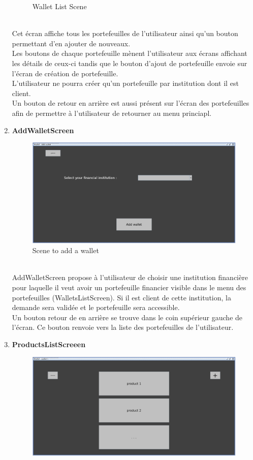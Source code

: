 \documentclass[../rapport.tex]{subfiles}
\begin{document}
\begin{enumerate}
\begin{figure}[h!]
				\caption{Wallet List Scene}
		\end{figure}
		\\
Cet écran affiche tous les portefeuilles de l'utilisateur ainsi qu'un bouton permettant d'en ajouter de nouveaux.\\
Les boutons de chaque portefeuille mènent l'utilisateur aux écrans affichant les détails de ceux-ci tandis que le bouton d'ajout de portefeuille envoie sur l'écran de création de portefeuille.\\
L'utilisateur ne pourra créer qu'un portefeuille par institution dont il est client.\\
Un bouton de retour en arrière est aussi présent sur l'écran des portefeuilles afin de permettre à l'utilisateur de retourner au menu princiapl.

\item \textbf{AddWalletScreen} \\
		\begin{figure}[h!]
				\centering \includegraphics[scale=0.2]{ressources/photos_diagrammes/app1/gui/addWallet.jpg}
				\caption{Scene to add a wallet}
		\end{figure}
		\\
AddWalletScreen propose à l'utilisateur de choisir une institution financière pour laquelle il veut avoir un portefeuille financier visible dans le menu des portefeuilles (WalletsListScreen). Si il est client de cette institution, la demande sera validée et le portefeuille sera accessible.\\
Un bouton retour de en arrière se trouve dans le coin supérieur gauche de l'écran. Ce bouton renvoie vers la liste des portefeuilles de l'utilisateur.
\newpage
\item \textbf{ProductsListScreeen} \\
		\begin{figure}[h!]
				\centering \includegraphics[scale=0.2]{ressources/photos_diagrammes/app1/gui/productsList.jpg}

\end{figure}
\end{enumerate}
\end{document}
